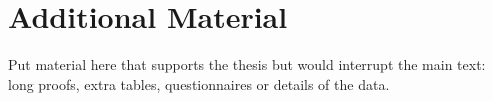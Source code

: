 \chapter{Additional Material}
\label{app:a}

Put material here that supports the thesis but would interrupt the main
text: long proofs, extra tables, questionnaires or details of the data.
